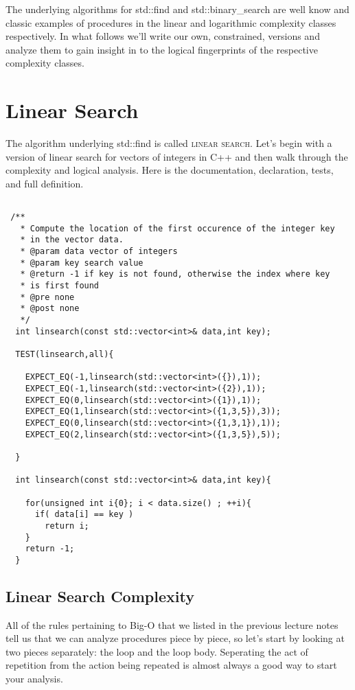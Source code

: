 \documentclass[]{tufte-handout}
\begin{document}
The underlying algorithms for std::find and std::binary\_search are well know and classic examples of procedures in the linear and logarithmic complexity classes respectively. In what follows we'll write our own, constrained, versions and analyze them to gain insight in to the logical fingerprints of the respective complexity classes. 

\section{Linear Search}

The algorithm underlying std::find is called \textsc{linear search}. Let's begin with a version of linear search for vectors of integers in C++ and then walk through the complexity and logical analysis. Here is the documentation, declaration, tests, and full definition.
\begin{verbatim}

 /** 
   * Compute the location of the first occurence of the integer key 
   * in the vector data. 
   * @param data vector of integers
   * @param key search value
   * @return -1 if key is not found, otherwise the index where key 
   * is first found
   * @pre none
   * @post none
   */
  int linsearch(const std::vector<int>& data,int key);
  
  TEST(linsearch,all){
    
    EXPECT_EQ(-1,linsearch(std::vector<int>({}),1));
    EXPECT_EQ(-1,linsearch(std::vector<int>({2}),1));
    EXPECT_EQ(0,linsearch(std::vector<int>({1}),1));
    EXPECT_EQ(1,linsearch(std::vector<int>({1,3,5}),3));
    EXPECT_EQ(0,linsearch(std::vector<int>({1,3,1}),1));
    EXPECT_EQ(2,linsearch(std::vector<int>({1,3,5}),5));

  }  

  int linsearch(const std::vector<int>& data,int key){
    
    for(unsigned int i{0}; i < data.size() ; ++i){
      if( data[i] == key )
     	return i;
    }
    return -1;
  }
\end{verbatim}

\subsection{Linear Search Complexity}

All of the rules pertaining to Big-O that we listed in the previous lecture notes tell us that we can analyze procedures piece by piece, so let's start by looking at two pieces separately: the loop and the loop body. Seperating the act of repetition from the action being repeated is almost always a good way to start your analysis. 
\end{document}
